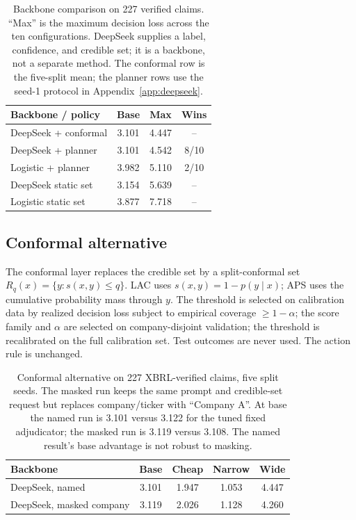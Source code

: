 \documentclass[11pt]{article}
\begin{document}
\begin{table}[t]
\centering
\small
\setlength{\tabcolsep}{3pt}
\begin{tabular}{lccc}
\toprule
Backbone / policy & Base & Max & Wins \\
\midrule
DeepSeek + conformal & 3.101 & 4.447 & -- \\
DeepSeek + planner & 3.101 & 4.542 & 8/10 \\
Logistic + planner & 3.982 & 5.110 & 2/10 \\
DeepSeek static set & 3.154 & 5.639 & -- \\
Logistic static set & 3.877 & 7.718 & -- \\
\bottomrule
\end{tabular}
\caption{Backbone comparison on 227 verified claims. ``Max'' is the maximum
decision loss across the ten configurations. DeepSeek supplies a label,
confidence, and credible set; it is a backbone, not a separate method. The
conformal row is the five-split mean; the planner rows use the seed-1 protocol
in Appendix~\ref{app:deepseek}.}
\label{tab:backbone}
\end{table}

\subsection{Conformal alternative}
\label{app:conformal}
The conformal layer replaces the credible set by a split-conformal set
\(R_q(x)=\{y:s(x,y)\le q\}\). LAC uses \(s(x,y)=1-p(y\mid x)\); APS uses the
cumulative probability mass through \(y\). The threshold is selected on
calibration data by realized decision loss subject to empirical coverage
\(\ge 1-\alpha\); the score family and \(\alpha\) are selected on
company-disjoint validation; the threshold is recalibrated on the full
calibration set. Test outcomes are never used. The action rule is unchanged.

\begin{table}[t]
\centering
\small
\setlength{\tabcolsep}{2pt}
\begin{tabular}{lcccc}
\toprule
Backbone & Base & Cheap & Narrow & Wide \\
\midrule
DeepSeek, named & 3.101 & 1.947 & 1.053 & 4.447 \\
DeepSeek, masked company & 3.119 & 2.026 & 1.128 & 4.260 \\
\bottomrule
\end{tabular}
\caption{Conformal alternative on 227 XBRL-verified claims, five split seeds. The masked run keeps the same prompt and credible-set request but replaces company/ticker with ``Company A''. At base the named run is 3.101 versus 3.122 for the tuned fixed adjudicator; the masked run is 3.119 versus 3.108. The named result's base advantage is not robust to masking.}
\label{tab:conformal}
\end{table}
\end{document}
